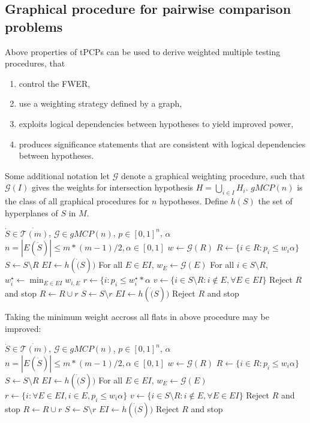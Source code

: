 \documentclass[a4paper,12pt]{article}
\newcommand{\gmcp}{\mathcal{G}}
\begin{document}
\subsection{Graphical procedure for pairwise comparison problems}

Above properties of tPCPs can be used to derive weighted multiple
testing procedures, that
\begin{enumerate}
\item control the FWER,
\item use a weighting strategy defined by a graph,
\item exploits logical dependencies between hypotheses to yield
  improved power,
\item produces significance statements that are consistent with
  logical dependencies between hypotheses.
\end{enumerate}

Some additional notation let $\gmcp$ denote a graphical weighting
procedure, such that $\gmcp(I)$ gives the weights for intersection
hypothesis $H = \bigcup_{i \in I} H_i$. $gMCP(n)$ is the class of all
graphical procedures for $n$ hypotheses. Define $h(S)$ the set of
hyperplanes of $S$ in $M$. 

\begin{algorithmic}
  \REQUIRE $\dot{S} \in \dot{\mathcal{T}(m)}$, $\gmcp \in gMCP(n)$, 
  $p \in [0,1]^n$, $\alpha$
  \ENSURE $n = |E(\dot{S})| \leq m*(m-1)/2, \alpha \in [0,1]$
  \STATE $w \gets \gmcp(R)$
  \STATE $R \gets \{i \in R: p_i \leq w_i \alpha\}$
  \STATE $S \gets S \setminus R$
  \STATE $EI \gets h(\dot(S))$
  \STATE For all $E \in EI$, $w_E \gets \gmcp(E)$
  \STATE For all $i \in S\setminus R$, $w_i^\star \gets \min_{E \in
    EI}w_{i,E}$
  \STATE $r \gets \{i:p_i \leq w_i^\star*\alpha$
  \STATE $v \gets \{i \in S\setminus R:i \notin E, \forall E \in EI\}$
  \STATE Reject $R$ and stop
  \ENDIF
  \STATE $R \gets R \cup r$
  \STATE $S \gets S\setminus r$
  \STATE $EI \gets h(\dot(S))$
  \ENDWHILE
  \STATE Reject $R$ and stop
\end{algorithmic}

Taking the minimum weight accross all flats in above procedure may be
improved:

\begin{algorithmic}
  \REQUIRE $\dot{S} \in \dot{\mathcal{T}(m)}$, $\gmcp \in gMCP(n)$, 
  $p \in [0,1]^n$, $\alpha$
  \ENSURE $n = |E(\dot{S})| \leq m*(m-1)/2, \alpha \in [0,1]$
  \STATE $w \gets \gmcp(R)$
  \STATE $R \gets \{i \in R: p_i \leq w_i \alpha\}$
  \STATE $S \gets S \setminus R$
  \STATE $EI \gets h(\dot(S))$
  \STATE For all $E \in EI$, $w_E \gets \gmcp(E)$
  \STATE $r \gets \{i:\forall E \in EI, i \in E,p_i \leq w_i \alpha\}$
  \STATE $v \gets \{i \in S\setminus R:i \notin E, \forall E \in EI\}$
  \STATE Reject $R$ and stop
  \ENDIF
  \STATE $R \gets R \cup r$
  \STATE $S \gets S\setminus r$
  \STATE $EI \gets h(\dot(S))$
  \ENDWHILE
  \STATE Reject $R$ and stop
\end{algorithmic}
\end{document}
